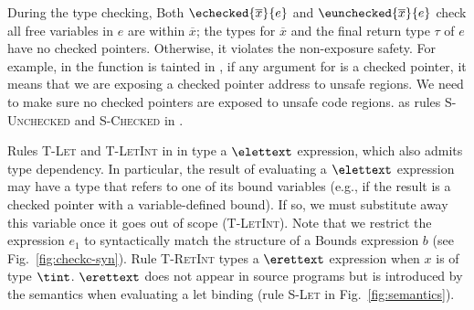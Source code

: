 %
During the type checking,
Both $\echecked{\overline{x}}{e}$ and $\eunchecked{\overline{x}}{e}$
check all free variables in $e$ are within $\overline{x}$;
the types for $\overline{x}$ and the final return type $\tau$ of $e$ have no checked pointers.
Otherwise, it violates the non-exposure safety.
For example,  in the  function is tainted in ,
if any argument for  is a checked pointer, 
it means that we are exposing a checked pointer address to unsafe regions.
% 
% 
% 
We need to make sure no checked pointers are  exposed to unsafe code regions.
as rules \textsc{S-Unchecked} and \textsc{S-Checked} in .
% 
% 

%
Rules \textsc{T-Let} and \textsc{T-LetInt} in in  type a $\elettext$ expression, which also admits
type dependency. 
In particular, the result of evaluating a $\elettext$ expression
may have a type that refers to one of its bound variables (e.g., if
the result is a checked pointer with a variable-defined bound). 
If so, we must substitute away this variable once it goes out of scope (\textsc{T-LetInt}). 
Note that we restrict the expression $e_1$ to syntactically match the
structure of a Bounds expression $b$ (see Fig.~\ref{fig:checkc-syn}).
Rule \textsc{T-RetInt} types a $\erettext$ expression when $x$ is of type $\tint$.
$\erettext$ does not appear in source programs but is introduced by the semantics when
evaluating a let binding (rule \textsc{S-Let} in
Fig.~\ref{fig:semantics}). 

